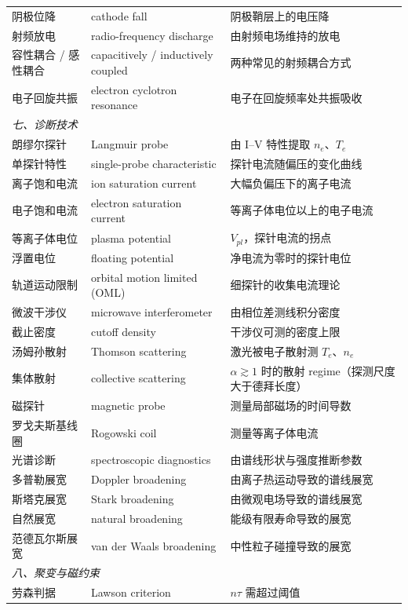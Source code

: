 \documentclass[12pt,a4paper,openany,oneside]{book}
\begin{document}
{\begin{longtable}{@{}p{4.2cm}p{5.6cm}p{4.8cm}@{}}
阴极位降 & cathode fall & 阴极鞘层上的电压降 \\
射频放电 & radio-frequency discharge & 由射频电场维持的放电 \\
容性耦合 / 感性耦合 & capacitively / inductively coupled & 两种常见的射频耦合方式 \\
电子回旋共振 & electron cyclotron resonance & 电子在回旋频率处共振吸收 \\
\multicolumn{3}{l}{\textit{七、诊断技术}} \\
\midrule
朗缪尔探针 & Langmuir probe & 由 I--V 特性提取 $n_e$、$T_e$ \\
单探针特性 & single-probe characteristic & 探针电流随偏压的变化曲线 \\
离子饱和电流 & ion saturation current & 大幅负偏压下的离子电流 \\
电子饱和电流 & electron saturation current & 等离子体电位以上的电子电流 \\
等离子体电位 & plasma potential & $V_{pl}$，探针电流的拐点 \\
浮置电位 & floating potential & 净电流为零时的探针电位 \\
轨道运动限制 & orbital motion limited (OML) & 细探针的收集电流理论 \\
微波干涉仪 & microwave interferometer & 由相位差测线积分密度 \\
截止密度 & cutoff density & 干涉仪可测的密度上限 \\
汤姆孙散射 & Thomson scattering & 激光被电子散射测 $T_e$、$n_e$ \\
集体散射 & collective scattering & $\alpha \gtrsim 1$ 时的散射 regime（探测尺度大于德拜长度） \\
磁探针 & magnetic probe & 测量局部磁场的时间导数 \\
罗戈夫斯基线圈 & Rogowski coil & 测量等离子体电流 \\
光谱诊断 & spectroscopic diagnostics & 由谱线形状与强度推断参数 \\
多普勒展宽 & Doppler broadening & 由离子热运动导致的谱线展宽 \\
斯塔克展宽 & Stark broadening & 由微观电场导致的谱线展宽 \\
自然展宽 & natural broadening & 能级有限寿命导致的展宽 \\
范德瓦尔斯展宽 & van der Waals broadening & 中性粒子碰撞导致的展宽 \\
\multicolumn{3}{l}{\textit{八、聚变与磁约束}} \\
\midrule
劳森判据 & Lawson criterion & $n\tau$ 需超过阈值 \\

\end{longtable}}
\end{document}
